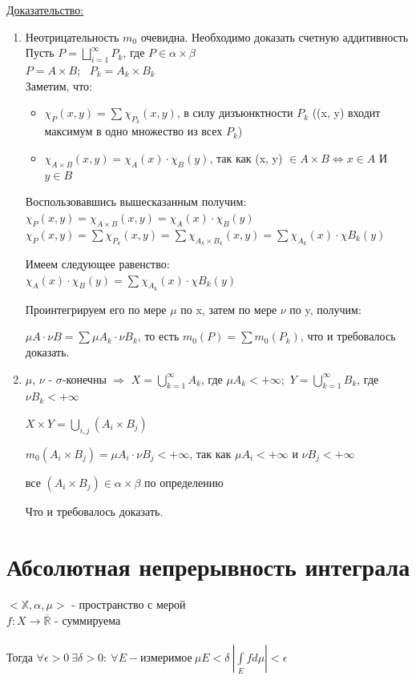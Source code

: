 \documentclass[paper=a4, fontsize=17pt]{article}
\begin{document}
\underline{Доказательство:} \\
\begin{enumerate}
	\item Неотрицательность $m_0$ очевидна. Необходимо доказать счетную аддитивность\\
	Пусть $P = \bigsqcup\limits_{i=1}^{\infty}P_{k}$, где $P \in \alpha \times \beta$ \\
	$P = A \times B$; \ $P_k = A_k \times B_k$ \\
	Заметим, что:
	\begin{itemize}
		\item $\chi_P(x, y) = \sum\chi_{P_k}(x, y)$, в силу дизъюнктности $P_k$ ((x, y) входит максимум в одно множество из всех $P_k$)
		\item $\chi_{A \times B}(x, y) = \chi_A(x) \cdot \chi_B(y)$, так как (x, y) $\in A\times B \Leftrightarrow x \in A$ И $y \in B$
	\end{itemize}
Воспользовавшись вышесказанным получим:\\
$\chi_{P}(x, y) = \chi_{A\times B}(x, y) = \chi_A(x) \cdot \chi_B(y)$\\
$\chi_{P}(x, y) = \sum\chi_{P_k}(x, y) = \sum\chi_{A_k \times B_k}(x, y) = \sum\chi_{A_k}(x) \cdot \chi{B_k}(y)$

Имеем следующее равенство:\\
$\chi_A(x) \cdot \chi_B(y) = \sum\chi_{A_k}(x) \cdot \chi{B_k}(y)$

Проинтегрируем его по мере $\mu$ по x, затем по мере $\nu$ по y, получим:

$\mu A \cdot \nu B = \sum \mu A_k \cdot \nu B_k$, то есть $m_0(P) = \sum m_0(P_k)$, что и требовалось доказать.
\item $\mu$, $\nu$ - $\sigma$-конечны $\Rightarrow$
$X = \bigcup\limits_{k=1}^{\infty} A_k$, где $\mu A_k < +\infty$;\
$Y = \bigcup\limits_{k=1}^{\infty} B_k$, где $\nu B_k < +\infty$

$X \times Y = \bigcup\limits_{i, j} (A_i \times B_j)$

$m_0(A_i \times B_j) = \mu A_i \cdot \nu B_j < +\infty$, так как $\mu A_i < +\infty$ и $\nu B_j < +\infty$

все $(A_i \times B_j) \in \alpha \times \beta$ по определению

Что и требовалось доказать.
\end{enumerate}

\section{Абсолютная непрерывность интеграла}
$<\mathds{X}, \alpha, \mu>$ - пространство с мерой\\
$f : X \to \overline{\mathds{R}}$ - суммируема\\\\
Тогда $\forall \epsilon > 0 ~ \exists \delta > 0 : ~ \forall E - \text{измеримое} ~ \mu E < \delta ~ |\int\limits_{E}f d\mu| < \epsilon$
\end{document}
